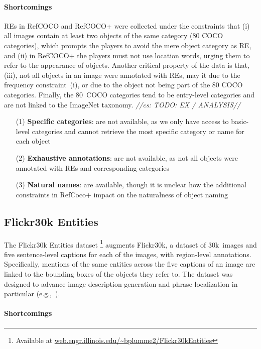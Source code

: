 \documentclass[runningheads]{llncs}
\newcommand{\cs}[1]{\textcolor{PineGreen}{\emph{//cs: #1//}}}
\newcommand{\refcoco}{RefCOCO\xspace}
\newcommand{\refcocop}{RefCOCO+\xspace}
\newcommand{\flickr}{Flickr30k Entities\xspace}
\begin{document}
\paragraph{Shortcomings}
REs in \refcoco and \refcocop were collected under the constraints that (i) all images contain at least two objects of the same category (80 COCO categories), which prompts the players to avoid the mere object category as RE, and (ii) in \refcocop the players must not use location words, urging them to refer to the appearance of objects. 
Another critical property of the data is that, (iii), not all objects in an image were annotated with REs, may it due to the frequency constraint~(i), or due to the object not being part of the 80 COCO categories. 
Finally, the $80$~COCO categories tend to be entry-level categories and are not linked to the ImageNet taxonomy. \cs{TODO: EX / ANALYSIS}

\begin{itemize}
     		\item[(1)] \textbf{Specific categories}: are not available, as we only have access to basic-level categories and cannot retrieve the  most specific category or name for each object
		\item[(2)] \textbf{Exhaustive annotations}: are not available, as not all objects were annotated with REs and corresponding categories
		   \item[(3)] \textbf{Natural names}: are available, though it is unclear how the additional constraints in RefCoco+ impact on the naturalness of object naming

\end{itemize}



\subsection{Flickr30k Entities}
The \flickr dataset \cite{plummer2015flickr30kentities}\footnote{Available at  \url{web.engr.illinois.edu/~bplumme2/Flickr30kEntities}}  augments Flickr30k, a dataset of 30k~images and five sentence-level captions for each of the images, with region-level annotations. 
Specifically, mentions of the same entities across the five captions of an image are linked to the bounding boxes of the objects they refer to. 
The dataset was designed to advance image description generation and phrase localization in particular (e.g.,~\cite{rohrbach2016grounding,plummer2017phrase,yeh2018unsupervised}). 

\paragraph{Shortcomings}
\end{document}
